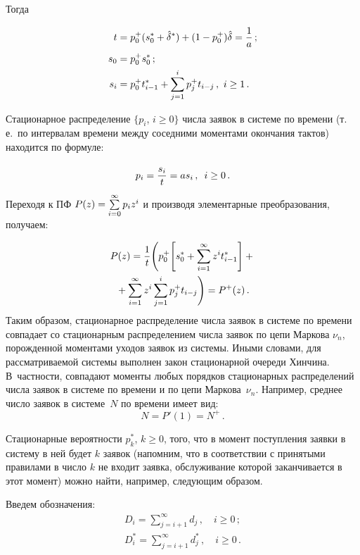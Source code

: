 \begin{multicols}{2}
Тогда

\noindent
\begin{align*}
t&= p_0^+ (s^*_0 + \hat \delta^*) + (1-p_0^+) \hat \delta = \displaystyle\frac{\displaystyle 1\mathstrut}{\displaystyle a\mathstrut}\,;\\
s_0 &= p^+_0 s^*_{0}\,;\\
s_i &= p^+_0 t^*_{i-1} + \sum_{j=1}^{i} p_j^+ t_{i-j}\,,
 \ i \ge 1\,.
\end{align*}

Стационарное распределение $\{p_{i}$, $i\ge 0\}$ числа заявок в
системе по времени (т.\,е.\ по интервалам времени между соседними
моментами окончания тактов) находится по формуле:

\noindent
\begin{equation*}
p_i= \displaystyle\frac{\displaystyle s_i\mathstrut}{\displaystyle t\mathstrut} = a s_i\,,
\enskip  i \ge 0\,.
\end{equation*}
Переходя к ПФ $P(z)\hm=\sum\limits_{i=0}^{\infty} p_{i}z^{i}$
и производя элементарные преобразования, получаем:

\noindent
\begin{multline}
\label{on_time}
P(z)= \displaystyle\frac{\displaystyle 1\mathstrut}{\displaystyle t\mathstrut} \Bigg(
p^{+}_{0} \Bigg[ s^*_0 + \sum\limits_{i=1}^{\infty} z^i t^*_{i-1} \Bigg]
+ {}\\
{}+\sum\limits_{i=1}^{\infty} z^i \sum_{j=1}^{i} p_j^+ t_{i-j}
\Bigg)
= P^+(z)\,.
\end{multline}
Таким образом, стационарное распределение числа заявок
в системе по времени совпадает со стационарным
распределением числа заявок по цепи Маркова $\nu_{n}$,
порожденной моментами уходов заявок из системы.
Иными словами, для рассматриваемой системы выполнен
закон стационарной очереди Хинчина.
В~частности, совпадают моменты любых порядков
стационарных распределений числа заявок в системе по
времени и по цепи Маркова~$\nu_{n}$.
Например, среднее число заявок в сис\-те\-ме~$N$ по времени
имеет вид:
\begin{equation*}
N = P'(1) = N^+ \,.
\end{equation*}


Стационарные вероятности $p_k^*$, $k\ge 0$, того,
что в момент поступления заявки в систему в ней
будет $k$ заявок (напомним, что в соответствии с
принятыми правилами в число $k$ не входит заявка,
обслуживание которой заканчивается в этот момент)
можно найти, например, следующим образом.

Введем обозначения:
\begin{gather*}
D_i= \sum_{j=i+1}^\infty d_j\,, \quad i\ge 0\,;\\
D^*_i = \sum_{j=i+1}^\infty d^*_j\,, \quad i\ge 0\,.
\end{gather*}


\end{multicols}
